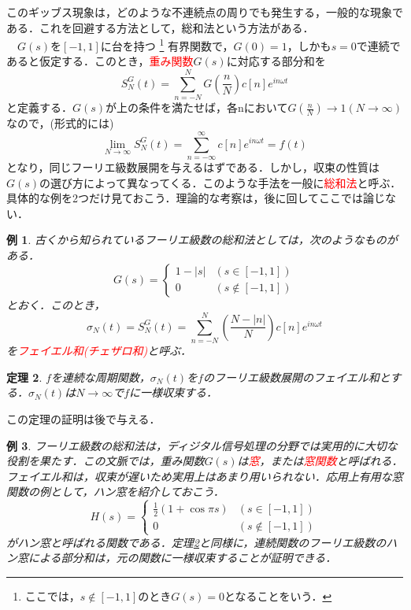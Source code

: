 \documentclass[a4j]{jsbook}
\newtheorem{theorem}{定理}
\newtheorem{example}[theorem]{例}
\numberwithin{theorem}{chapter}  %
\begin{document}
このギッブス現象は，どのような不連続点の周りでも発生する，一般的な現象である．これを回避する方法として，総和法という方法がある．\\
　\(G(s)\)を\([-1, 1]\)に台を持つ
\footnote{
ここでは，\(s\notin[-1, 1]\)のとき\(G(s)=0\)となることをいう．
}
有界関数で，\(G(0)=1\)，しかも\(s=0\)で連続であると仮定する．このとき，\textcolor{red}{重み関数}\(G(s)\)に対応する部分和を
\begin{equation*}
    S_N^G(t)=\sum_{n=-N}^N G\left(\frac{n}{N}\right)c[n]e^{in\omega t}
\end{equation*}
と定義する．\(G(s)\)が上の条件を満たせば，各nにおいて\(\displaystyle G\left(\frac{n}{N}\right)\to 1(N\to\infty)\)なので，(形式的には)
\begin{equation*}
    \lim_{N\to\infty}S_N^G(t)=\sum_{n=-\infty}^\infty c[n]e^{in\omega t}=f(t)
\end{equation*}
となり，同じフーリエ級数展開を与えるはずである．しかし，収束の性質は\(G(s)\)の選び方によって異なってくる．このような手法を一般に\textcolor{red}{総和法}と呼ぶ．具体的な例を2つだけ見ておこう．理論的な考察は，後に回してここでは論じない．
\begin{example}
\label{ex1-5}
古くから知られているフーリエ級数の総和法としては，次のようなものがある．
\begin{equation*}
    G(s)
    =
    \begin{cases}
    1-|s| & (s\in[-1, 1]) \\
    0 & (s\notin[-1, 1])
    \end{cases}
\end{equation*}
とおく．このとき，
\begin{equation*}
    \sigma_N(t)=S_N^G(t)=\sum_{n=-N}^N\left(\frac{N-|n|}{N}\right)c[n]e^{in\omega t}
\end{equation*}
を\textcolor{red}{フェイエル和(チェザロ和)}と呼ぶ．
\end{example}
\begin{theorem}
\label{th1-14}
\(f\)を連続な周期関数，\(\sigma_N(t)\)を\(f\)のフーリエ級数展開のフェイエル和とする．\(\sigma_N(t)\)は\(N\to\infty\)で\(f\)に一様収束する．
\end{theorem}
この定理の証明は後で与える．
\begin{example}
\label{ex1-6}
フーリエ級数の総和法は，ディジタル信号処理の分野では実用的に大切な役割を果たす．この文脈では，重み関数\(G(s)\)は\textcolor{red}{窓}，または\textcolor{red}{窓関数}と呼ばれる．フェイエル和は，収束が遅いため実用上はあまり用いられない．応用上有用な窓関数の例として，ハン窓を紹介しておこう．
\begin{equation*}
    H(s)
    =
    \begin{cases}
    \frac{1}{2}(1+\cos\pi s) & (s\in[-1, 1]) \\
    0 & (s\notin[-1, 1])
    \end{cases}
\end{equation*}
がハン窓と呼ばれる関数である．定理\ref{th1-14}と同様に，連続関数のフーリエ級数のハン窓による部分和は，元の関数に一様収束することが証明できる．
\end{example}
\end{document}
